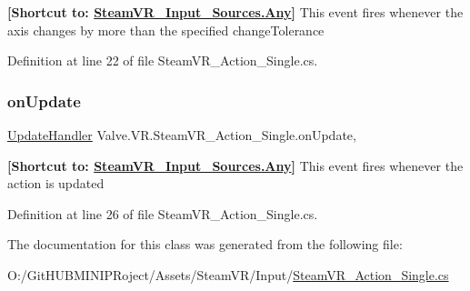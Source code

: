 {\bfseries{\mbox{[}Shortcut to\+: \mbox{\hyperlink{namespace_valve_1_1_v_r_a82e5bf501cc3aa155444ee3f0662853faed36a1ef76a59ee3f15180e0441188ad}{Steam\+V\+R\+\_\+\+Input\+\_\+\+Sources.\+Any}}\mbox{]}}} This event fires whenever the axis changes by more than the specified change\+Tolerance 



Definition at line 22 of file Steam\+V\+R\+\_\+\+Action\+\_\+\+Single.\+cs.

\mbox{\label{class_valve_1_1_v_r_1_1_steam_v_r___action___single_a560a7271eccd9441f110d40beed27170}} 
\subsubsection{\texorpdfstring{onUpdate}{onUpdate}}
{\footnotesize\ttfamily \mbox{\hyperlink{class_valve_1_1_v_r_1_1_steam_v_r___action___single_a1514666eabcafba498274e8d6cee2a40}{Update\+Handler}} Valve.\+V\+R.\+Steam\+V\+R\+\_\+\+Action\+\_\+\+Single.\+on\+Update\hspace{0.3cm}{\ttfamily [add]}, {\ttfamily [remove]}}



{\bfseries{\mbox{[}Shortcut to\+: \mbox{\hyperlink{namespace_valve_1_1_v_r_a82e5bf501cc3aa155444ee3f0662853faed36a1ef76a59ee3f15180e0441188ad}{Steam\+V\+R\+\_\+\+Input\+\_\+\+Sources.\+Any}}\mbox{]}}} This event fires whenever the action is updated 



Definition at line 26 of file Steam\+V\+R\+\_\+\+Action\+\_\+\+Single.\+cs.



The documentation for this class was generated from the following file\+:\begin{DoxyCompactItemize}
\item 
O\+:/\+Git\+H\+U\+B\+M\+I\+N\+I\+P\+Roject/\+Assets/\+Steam\+V\+R/\+Input/\mbox{\hyperlink{_steam_v_r___action___single_8cs}{Steam\+V\+R\+\_\+\+Action\+\_\+\+Single.\+cs}}\end{DoxyCompactItemize}
